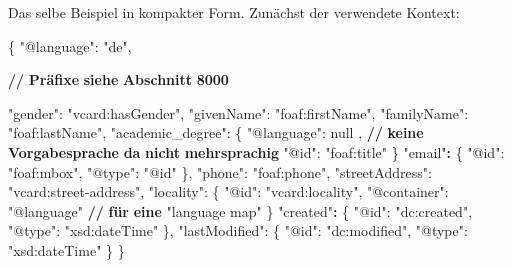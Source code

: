 \documentclass[,a4paper]{article}
\newenvironment{Shaded}{}{}
\newcommand{\DataTypeTok}[1]{\textcolor[rgb]{0.56,0.13,0.00}{{#1}}}
\newcommand{\DecValTok}[1]{\textcolor[rgb]{0.25,0.63,0.44}{{#1}}}
\newcommand{\StringTok}[1]{\textcolor[rgb]{0.25,0.44,0.63}{{#1}}}
\newcommand{\ErrorTok}[1]{\textcolor[rgb]{1.00,0.00,0.00}{\textbf{{#1}}}}
\newcommand{\NormalTok}[1]{{#1}}
\begin{document}
Das selbe Beispiel in kompakter Form. Zunächst der verwendete Kontext:

\begin{Shaded}
\begin{Highlighting}[]
\NormalTok{\{}
    \DataTypeTok{"@language"}\NormalTok{: }\StringTok{"de"}\NormalTok{,}
    
    \ErrorTok{//} \ErrorTok{Präfixe} \ErrorTok{siehe} \ErrorTok{Abschnitt} \ErrorTok{8000}

    \DataTypeTok{"gender"}\NormalTok{: }\StringTok{"vcard:hasGender"}\NormalTok{,}
    \DataTypeTok{"givenName"}\NormalTok{: }\StringTok{"foaf:firstName"}\NormalTok{,}
    \DataTypeTok{"familyName"}\NormalTok{: }\StringTok{"foaf:lastName"}\NormalTok{,}
    \DataTypeTok{"academic_degree"}\NormalTok{: \{}
        \DataTypeTok{"@language"}\NormalTok{: }\DecValTok{null} \NormalTok{, }\ErrorTok{//} \ErrorTok{keine} \ErrorTok{Vorgabesprache} \ErrorTok{da} \ErrorTok{nicht} \ErrorTok{mehrsprachig}
        \DataTypeTok{"@id"}\NormalTok{: }\StringTok{"foaf:title"}
    \NormalTok{\}}
    \StringTok{"email"}\ErrorTok{:} \NormalTok{\{}
        \DataTypeTok{"@id"}\NormalTok{: }\StringTok{"foaf:mbox"}\NormalTok{,}
        \DataTypeTok{"@type"}\NormalTok{: }\StringTok{"@id"}
    \NormalTok{\},}
    \DataTypeTok{"phone"}\NormalTok{: }\StringTok{"foaf:phone"}\NormalTok{,}
    \DataTypeTok{"streetAddress"}\NormalTok{: }\StringTok{"vcard:street-address"}\NormalTok{,}
    \DataTypeTok{"locality"}\NormalTok{: \{}
        \DataTypeTok{"@id"}\NormalTok{: }\StringTok{"vcard:locality"}\NormalTok{,}
        \DataTypeTok{"@container"}\NormalTok{: }\StringTok{"@language"} \ErrorTok{//} \ErrorTok{für} \ErrorTok{eine} \StringTok{"language map"}
    \NormalTok{\}}
    \StringTok{"created"}\ErrorTok{:} \NormalTok{\{}
        \DataTypeTok{"@id"}\NormalTok{: }\StringTok{"dc:created"}\NormalTok{,}
        \DataTypeTok{"@type"}\NormalTok{: }\StringTok{"xsd:dateTime"}
    \NormalTok{\},}
    \DataTypeTok{"lastModified"}\NormalTok{: \{}
        \DataTypeTok{"@id"}\NormalTok{: }\StringTok{"dc:modified"}\NormalTok{,}
        \DataTypeTok{"@type"}\NormalTok{: }\StringTok{"xsd:dateTime"}
    \NormalTok{\}}
\NormalTok{\}}
\end{Highlighting}
\end{Shaded}
\end{document}

